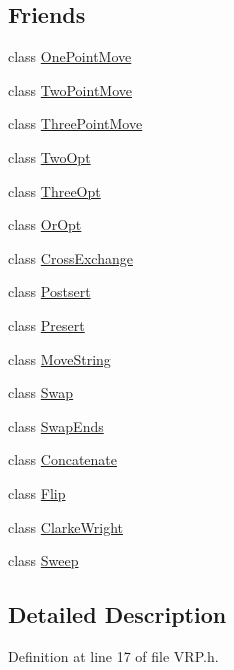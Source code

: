 \subsection*{Friends}
\begin{DoxyCompactItemize}
\item 
class \hyperlink{class_v_r_p_a3eb7e09375cb9efb60e174576602cc2a}{OnePointMove}
\item 
class \hyperlink{class_v_r_p_a39ceb628e29d77c67f2f02033a2947fd}{TwoPointMove}
\item 
class \hyperlink{class_v_r_p_af9c805ac13341028e10098c88c60b2ba}{ThreePointMove}
\item 
class \hyperlink{class_v_r_p_a0c92c8936f6281af1fd5ed7eac0ebf7a}{TwoOpt}
\item 
class \hyperlink{class_v_r_p_af723275dce636f74121f91687deedc70}{ThreeOpt}
\item 
class \hyperlink{class_v_r_p_aad4e90257d9562aaba2f6cb67b18b0b4}{OrOpt}
\item 
class \hyperlink{class_v_r_p_ab4edeb2c24ce03a58fd64a672344879d}{CrossExchange}
\item 
class \hyperlink{class_v_r_p_a0db13b3e7109396073d590aa1a62d0ec}{Postsert}
\item 
class \hyperlink{class_v_r_p_ab909d662038d19e5f8fe92828f2876c0}{Presert}
\item 
class \hyperlink{class_v_r_p_a639ad495d8fe15a35cd86e1e1bf86864}{MoveString}
\item 
class \hyperlink{class_v_r_p_a70514fe066409f0e910cf8622c6ec2fd}{Swap}
\item 
class \hyperlink{class_v_r_p_a8dcd8df53052c8616440b02c62028d2b}{SwapEnds}
\item 
class \hyperlink{class_v_r_p_a297dde4c15143a11faf5fbaec854461c}{Concatenate}
\item 
class \hyperlink{class_v_r_p_a01b574361116f8cdbdee667c2f0c7068}{Flip}
\item 
class \hyperlink{class_v_r_p_af4ac00f95018bc06be8f4ae5e19b3357}{ClarkeWright}
\item 
class \hyperlink{class_v_r_p_a908f328c298fc585c89c0ab14546aeba}{Sweep}
\end{DoxyCompactItemize}


\subsection{Detailed Description}


Definition at line 17 of file VRP.h.




